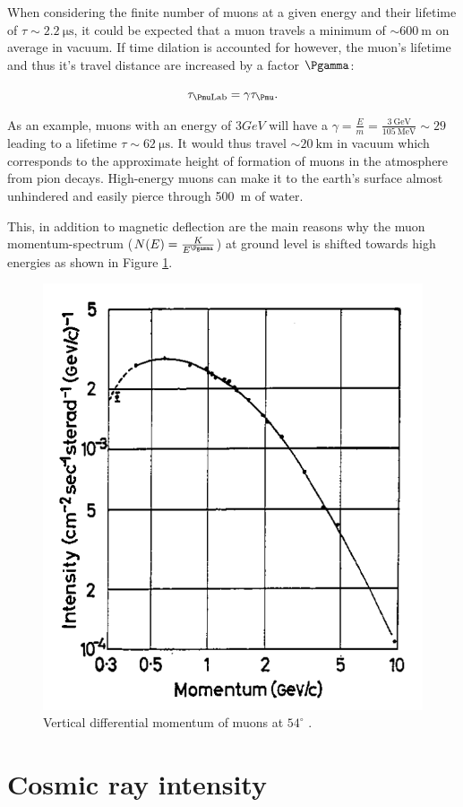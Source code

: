 When considering the finite number of muons at a given energy and their lifetime of $\tau\sim\SI{2.2}{\micro\second}$, it could be expected that a muon travels a minimum of $\sim \SI{600}{\meter}$ on average in vacuum. If time dilation is accounted for however, the muon's lifetime and thus it's travel distance are increased by a factor $\Pgamma$:

\begin{equation}
\tau_{\Pmu\text{Lab}}=\gamma\tau_{\Pmu}.
\end{equation}

As an example, muons with an energy of $3 GeV$ will have a $\gamma=\frac{E}{m}=\frac{\SI{3}{\GeV}}{\SI{105}{\MeV}}\sim 29$ leading to a lifetime $\tau \sim \SI{62}{\micro\second}$. It would thus travel $\sim \SI{20}{\kilo\meter}$ in vacuum which corresponds to the approximate height of formation of muons in the atmosphere from pion decays. High-energy muons can make it to the earth's surface almost unhindered and easily pierce through \SI{500}{\meter} of water.

This, in addition to magnetic deflection are the main reasons why the muon momentum-spectrum ($N(E)=\frac{K}{E^{\Pgamma}}$) at ground level is shifted towards high energies as shown in Figure \ref{fig:shift}.

\begin{figure}[htbp]
\centering
\includegraphics[width=0.5\linewidth]{./fig/shiftDur.png}
\caption{Vertical differential momentum of muons at $54^\circ$ \cite{Gardener_1962}.}
\label{fig:shift}
\end{figure}


\section{Cosmic ray intensity}

